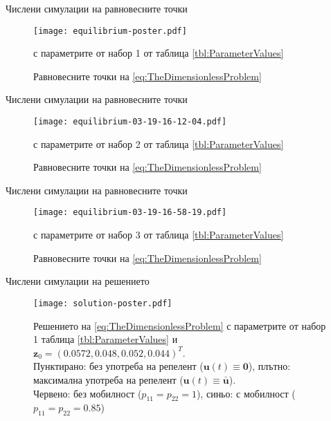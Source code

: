 \begin{frame}[t]{Числени симулации на равновесните точки}
  \begin{figure}[h]
    \centering
    \texttt{[image: equilibrium-poster.pdf]}
    \caption{Равновесните точки на \eqref{eq:TheDimensionlessProblem}} с параметрите от набор 1 от таблица \ref{tbl:ParameterValues}
    \label{fig:EquilibriumPoints-poster}
  \end{figure}
\end{frame}

\begin{frame}[t]{Числени симулации на равновесните точки}
  \begin{figure}[h]
    \centering
    \texttt{[image: equilibrium-03-19-16-12-04.pdf]}
    \caption{Равновесните точки на \eqref{eq:TheDimensionlessProblem}} с параметрите от набор 2 от таблица \ref{tbl:ParameterValues}
    \label{fig:EquilibriumPoints-03-19-16-12-04}
  \end{figure}
\end{frame}

\begin{frame}[t]{Числени симулации на равновесните точки}
  \begin{figure}[h]
    \centering
    \texttt{[image: equilibrium-03-19-16-58-19.pdf]}
    \caption{Равновесните точки на \eqref{eq:TheDimensionlessProblem}} с параметрите от набор 3 от таблица \ref{tbl:ParameterValues}
    \label{fig:EquilibriumPoints-03-19-16-58-19}
  \end{figure}
\end{frame}

\begin{frame}[t]{Числени симулации на решението}
  \begin{figure}[h]
    \centering
    \texttt{[image: solution-poster.pdf]}
    \caption{Решението на \eqref{eq:TheDimensionlessProblem} с параметрите от набор 1 таблица \ref{tbl:ParameterValues} и $\mathbf{z}_0=(0.0572, 0.048, 0.052, 0.044)^T$.\\
      Пунктирано: без употреба на репелент ($\mathbf{u}(t) \equiv \mathbf{0}$), плътно: максимална употреба на репелент ($\mathbf{u}(t) \equiv \bar{\mathbf{u}}$).\\
    Червено: без мобилност ($p_{11}=p_{22}=1$), синьо: с мобилност ($p_{11}=p_{22}=0.85$)}
    \label{fig:Solution-poster}
  \end{figure}
\end{frame}

